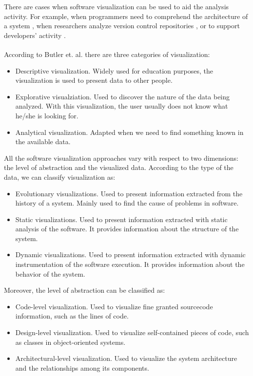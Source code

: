 There are cases when software visualization can be used to aid the analysis activity. For example, when programmers need to comprehend the architecture of a system \cite{Panas2007}, when researchers analyze version control repositories \cite{Greene2017}, or to support developers' activity \cite{LopezHerrejon2018}. \\
\\
According to Butler et. al. \cite{Butler1993} there are three categories of visualization:
\begin{itemize}
	 \item Descriptive visualization. Widely used for education purposes, the visualization is used to present data to other people. 
	 \item Explorative visualziation. Used to discover the nature of the data being analyzed. With this visualization, the user usually does not know what he/she is looking for. 
	 \item Analytical visualization. Adapted when we need to find something known in the available data. 
\end{itemize}
All the software visualization approaches vary with respect to two dimensions: the level of abstraction and the visualized data.
According to the type of the data, we can classify visualization as:
\begin{itemize}
	\item Evolutionary visualizations. Used to present information extracted from the history of a system. Mainly used to find the cause of problems in software. 
	\item Static visualizations. Used to present information extracted with static analysis of the software. It provides information about the structure of the system.
	\item Dynamic visualizations. Used to present information extracted with dynamic instrumentation of the software execution. It provides information about the behavior of the system.
\end{itemize}

Moreover, the level of abstraction can be classified as:
\begin{itemize}
	\item Code-level visualization. Used to visualize fine granted sourcecode information, such as the lines of code. 
	\item Design-level visualization. Used to visualize self-contained pieces of code, such as classes in object-oriented systems. 
	\item Architectural-level visualization. Used to visualize the system architecture and the relationships among its components. 
\end{itemize}



